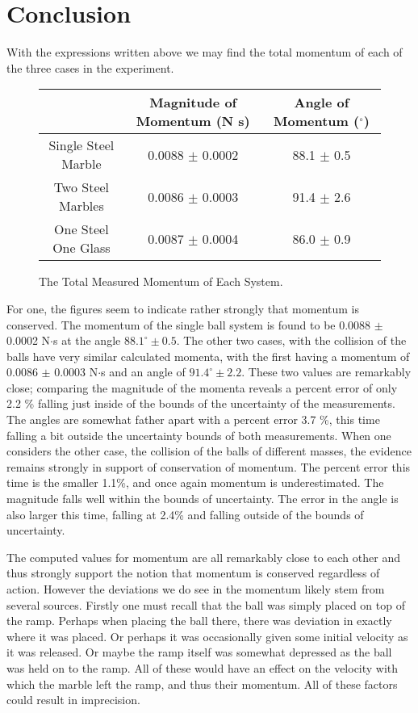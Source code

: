 \documentclass[11pt]{article}
\begin{document}
\section{Conclusion}
With the expressions written above we may find the total momentum of each of the three cases in the experiment.
\begin{figure}[h]
	\caption{The Total Measured Momentum of Each System.}
	\begin{center}
\begin{tabular}{|c|c|c|}
	\hline 
	& Magnitude of Momentum (N s) & Angle of Momentum (\({}^{\circ}\))  \\ 
	\hline 
	Single Steel Marble &  0.0088  \( \pm \) 0.0002 & 88.1 \( \pm \) 0.5  \\ 
	\hline 
	Two Steel Marbles &  0.0086 \(\pm\)     0.0003 	& 91.4 \( \pm \) 2.6 \\ 
	\hline 
	One Steel One Glass &  0.0087 \( \pm \) 0.0004 & 86.0 \( \pm \) 0.9 \\ 
	\hline 
\end{tabular} 
\end{center}
\end{figure}

For one, the figures seem to indicate rather strongly that momentum is conserved. The momentum of the single ball system is found to be 0.0088 \( \pm \) 0.0002 N\(\cdot\)s at the angle  \( {88.1}^{\circ} \pm 0.5\). The other two cases, with the collision of the balls have very similar calculated momenta, with the first having a momentum of 0.0086 \( \pm \) 0.0003 N\(\cdot\)s and an angle of \( {91.4}^{\circ} \pm 2.2\). These two values are remarkably close; comparing the magnitude of the momenta reveals a percent error of only 2.2 \% falling just inside of the bounds of the uncertainty of the measurements. The angles are somewhat father apart with a percent error 3.7 \%, this time falling a bit outside the uncertainty bounds of both measurements. When one considers the other case, the collision of the balls of different masses, the evidence remains strongly in support of conservation of momentum. The percent error this time is the smaller 1.1\%, and once again momentum is underestimated. The magnitude falls well within the bounds of uncertainty. The error in the angle is also larger this time, falling at 2.4\% and falling outside of the bounds of uncertainty.

The computed values for momentum are all remarkably close to each other and thus strongly support the notion that momentum is conserved regardless of action. However the deviations we do see in the momentum likely stem from several sources. Firstly one must recall that the ball was simply placed on top of the ramp. Perhaps when placing the ball there, there was deviation in exactly where it was placed. Or perhaps it was occasionally given some initial velocity as it was released. Or maybe the ramp itself was somewhat depressed as the ball was held on to the ramp. All of these would have an effect on the velocity with which the marble left the ramp, and thus their momentum.  All of these factors could result in imprecision.
\end{document}
